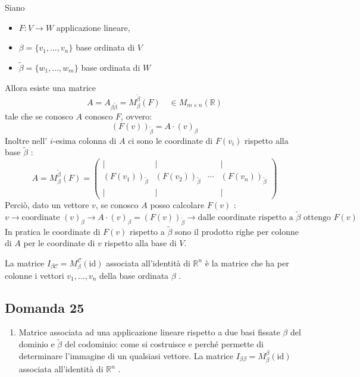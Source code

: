 \documentclass[
  a4paper,
]{article}
\providecommand{\tightlist}{%
  \setlength{\itemsep}{0pt}\setlength{\parskip}{0pt}}
\providecommand{\tightlist}{}
\begin{document}
Siano

\begin{itemize}
\tightlist
\item
  \(F : V \to W\) applicazione lineare,
\item
  \(\beta = \{v_1, \dots, v_n\}\) base ordinata di \(V\)
\item
  \(\widetilde{\beta} = \{w_1, \dots, w_m\}\) base ordinata di \(W\)
\end{itemize}

Allora esiste una matrice \[
A = A_{\beta \widetilde{\beta}} = M^{\widetilde{\beta}}_{\beta}(F) \quad \in M_{m\times n}(\mathbb{R})
\] tale che se conosco \(A\) conosco \(F\), ovvero: \[
(F(v))_{\widetilde{\beta}} = A\cdot(v)_{\beta}
\] Inoltre nell' \(i\)-esima colonna di \(A\) ci sono le coordinate di
\(F(v_i)\) rispetto alla base \(\widetilde{\beta}\) : \[
A=M^{\widetilde{\beta}}_{\beta}(F)  
=  
\left(  
\begin{array}{cccc}  
\big| & \big| & & \big| \\  
(F(v_1))_{\widetilde{\beta}}  
&  
(F(v_2))_{\widetilde{\beta}}  
&  
\cdots  
&  
(F(v_n))_{\widetilde{\beta}}  
\\  
\big| & \big| & & \big|  
\end{array}  
\right)
\] Perciò, dato un vettore \(v\), se conosco \(A\) posso calcolare
\(F(v)\) : \[
v \to \text{coordinate } (v)_{\beta} \to A \cdot (v)_\beta = (F(v))_{\widetilde{\beta}} \to \text{dalle coordinate rispetto a } \widetilde{\beta} \text{ ottengo } F(v)
\] In pratica le coordinate di \(F(v)\) rispetto a \(\widetilde{\beta}\)
sono il prodotto righe per colonne di \(A\) per le coordinate di \(v\)
rispetto alla base di \(V\).

\bigskip

La matrice
\(I_{\beta \mathcal{C}} = M_{\beta}^{\mathcal{C}}(\text{id})\) associata
all'identità di \(\mathbb{R}^n\) è la matrice che ha per colonne i
vettori \(v_1, \dots , v_n\) della base ordinata \(\beta\) .

\hypertarget{domanda-25}{%
\subsection{Domanda 25}\label{domanda-25}}

\begin{observationbox}[Domanda]
\begin{enumerate}
\def\labelenumi{\arabic{enumi}.}
\setcounter{enumi}{24}
\tightlist
\item
  Matrice associata ad una applicazione lineare rispetto a due basi
  fissate \(\beta\) del dominio e \(\widetilde{\beta}\) del codominio:
  come si costruisce e perché permette di determinare l'immagine di un
  qualsiasi vettore. La matrice
  \(I_{\beta \beta} = M_{\beta}^{\beta}(\text{id})\) associata
  all'identità di \(\mathbb{R}^n\) .
\end{enumerate}
\end{observationbox}
\end{document}
